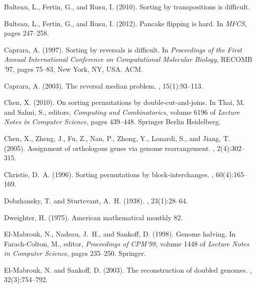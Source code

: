 \documentclass[11pt,final,twoside,nofrench]{thlifl}
\begin{document}
\begin{thebibliography}{}
Bulteau, L., Fertin, G., and Rusu, I. (2010).
\newblock Sorting by transpositions is difficult.

Bulteau, L., Fertin, G., and Rusu, I. (2012).
\newblock Pancake flipping is hard.
\newblock In {\em MFCS}, pages 247--258.

Caprara, A. (1997).
\newblock Sorting by reversals is difficult.
\newblock In {\em Proceedings of the First Annual International Conference on
  Computational Molecular Biology}, RECOMB '97, pages 75--83, New York, NY,
  USA. ACM.

Caprara, A. (2003).
\newblock The reversal median problem.
, 15(1):93--113.

Chen, X. (2010).
\newblock On sorting permutations by double-cut-and-joins.
\newblock In Thai, M. and Sahni, S., editors, {\em Computing and
  Combinatorics}, volume 6196 of {\em Lecture Notes in Computer Science}, pages
  439--448. Springer Berlin Heidelberg.

Chen, X., Zheng, J., Fu, Z., Nan, P., Zhong, Y., Lonardi, S., and Jiang, T.
  (2005).
\newblock Assignment of orthologous genes via genome rearrangement.
, 2(4):302--315.

Christie, D.~A. (1996).
\newblock Sorting permutations by block-interchanges.
, 60(4):165--169.

Dobzhansky, T. and Sturtevant, A.~H. (1938).
, 23(1):28--64.

Dweighter, H. (1975).
\newblock American mathematical monthly 82.

El-Mabrouk, N., Nadeau, J.~H., and Sankoff, D. (1998).
\newblock Genome halving.
\newblock In Farach-Colton, M., editor, {\em Proceedings of CPM'98}, volume
  1448 of {\em Lecture Notes in Computer Science}, pages 235--250. Springer.

El-Mabrouk, N. and Sankoff, D. (2003).
\newblock The reconstruction of doubled genomes.
, 32(3):754--792.


\end{thebibliography}
\end{document}
